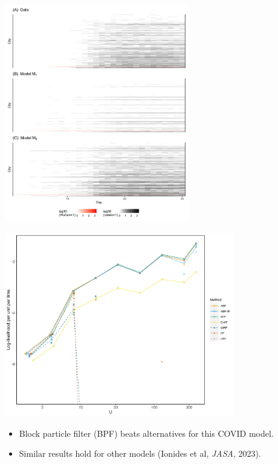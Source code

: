 \documentclass{beamer}
\begin{document}
\begin{frame}
  \begin{center}
    \includegraphics[height=9.5cm]{covid/panel_plot-1.png}
    \end{center}
\end{frame}


\begin{frame}
 \includegraphics[width=10cm]{covid/filter_tests10.png}

  \begin{itemize}
\item Block particle filter (BPF) beats alternatives for this COVID model.
\item Similar results hold for other models (Ionides et al, {\it JASA}, 2023).
  \end{itemize}
  
\end{frame}
\end{document}
